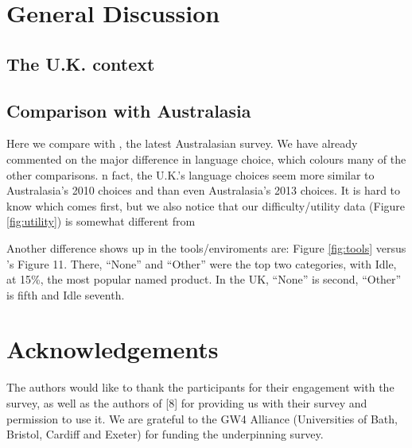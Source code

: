 \documentclass{sig-alternate}
\begin{document}
\section{General Discussion}\label{discussion}

\subsection{The U.K. context}

\subsection{Comparison with Australasia}

Here we compare with \cite{mason+cooper:2014}, the latest Australasian
survey. We have already commented on the major difference in language
choice, which colours many of the other comparisons. n fact, the
U.K.'s language choices seem more similar to Australasia's 2010
choices \cite{mason-et-al:2012} and \cite[Table 4]{mason+cooper:2014}
than even Australasia's 2013 choices. It is hard to know which comes
first, but we also notice that our difficulty/utility data (Figure
\ref{fig:utility}) is somewhat different from \cite[Figures
7,8]{mason+cooper:2014}

Another difference shows up in the tools/enviroments are: Figure
\ref{fig:tools} versus \cite{mason+cooper:2014}'s Figure 11. There,
``None'' and ``Other'' were the top two categories, with Idle, at
15\%, the most popular named product. In the UK, ``None'' is second, ``Other'' is fifth
and Idle seventh.


\section{Acknowledgements}

The authors would like to thank the participants for their engagement
with the survey, as well as the authors of [8] for providing us with
their survey and permission to use it.
We are grateful to the GW4 Alliance (Universities of Bath, Bristol,
Cardiff and Exeter) for funding the underpinning survey.


\end{document}
